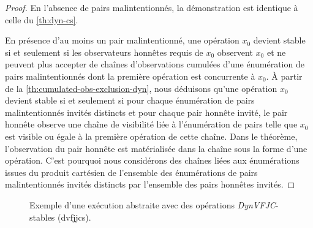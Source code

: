 \begin{proof}
En l'absence de pairs malintentionnés, la démonstration est identique à celle du \autoref{th:dyn-cs}.

En présence d'au moins un pair malintentionné, une opération $x_0$ devient stable si et seulement si les observateurs honnêtes requis de $x_0$ observent $x_0$ et ne peuvent plus accepter de chaînes d'observations cumulées d'une énumération de pairs malintentionnés dont la première opération est concurrente à $x_0$.
À partir de la \autoref{th:cumulated-obs-exclusion-dyn}, nous déduisons qu'une opération $x_0$ devient stable si et seulement si pour chaque énumération de pairs malintentionnés invités distincts et pour chaque pair honnête invité, le pair honnête observe une chaîne de visibilité liée à l'énumération de pairs telle que $x_0$ est visible ou égale à la première opération de cette chaîne.
Dans le théorème, l'observation du pair honnête est matérialisée dans la chaîne sous la forme d'une opération.
C'est pourquoi nous considérons des chaînes liées aux énumérations issues du produit cartésien de l'ensemble des énumérations de pairs malintentionnés invités distincts par l'ensemble des pairs honnêtes invités.
\end{proof}

\begin{figure}[htb]
\centering
{}
\caption[Stabilité \acl{VFJC} dynamique]{Exemple d'une exécution abstraite avec des opérations \emph{DynVFJC}-stables (dvfjjcs).}\label{fig:dvfjcs-example}
\end{figure}

